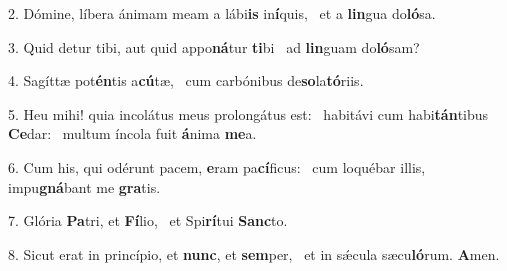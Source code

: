 2. Dómine, líbera ánimam meam a lábi\textbf{is} in\textbf{í}quis, \ast\  et a \textbf{lin}gua do\textbf{ló}sa.\

3. Quid detur tibi, aut quid appo\textbf{ná}tur \textbf{ti}bi \ast\  ad \textbf{lin}guam do\textbf{ló}sam?\

4. Sagíttæ pot\textbf{én}tis a\textbf{cú}tæ, \ast\  cum carbónibus de\textbf{so}la\textbf{tó}riis.\

5. Heu mihi! quia incolátus meus prolongátus est: \dag\  habitávi cum habi\textbf{tán}tibus \textbf{Ce}dar: \ast\  multum íncola fuit \textbf{á}nima \textbf{me}a.\

6. Cum his, qui odérunt pacem, \textbf{e}ram pa\textbf{cí}ficus: \ast\  cum loquébar illis, impu\textbf{gná}bant me \textbf{gra}tis.\

7. Glória \textbf{Pa}tri, et \textbf{Fí}lio, \ast\  et Spi\textbf{rí}tui \textbf{Sanc}to.\

8. Sicut erat in princípio, et \textbf{nunc}, et \textbf{sem}per, \ast\  et in sǽcula sæcu\textbf{ló}rum. \textbf{A}men.\

